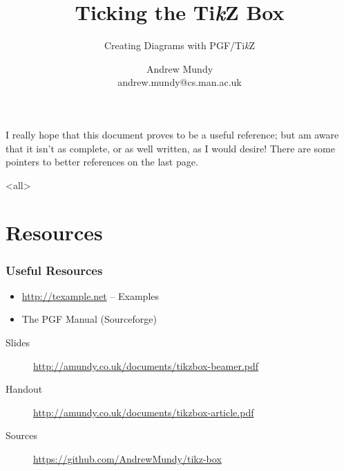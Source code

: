 \title{Ticking the Ti\emph{k}Z Box}
\subtitle{Creating Diagrams with PGF/Ti\emph{k}Z}
\author{Andrew Mundy\\andrew.mundy@cs.man.ac.uk}
\date{}

\usepackage{tikz}
\usetikzlibrary{automata,chains,scopes,patterns,petri}

\usepackage{etoolbox}

\usepackage{subcaption}

\lstset{
	frame = tb,
	columns = fullflexible,
}


	\maketitle
	\begin{frame}
		\titlepage
	\end{frame}

	I really hope that this document proves to be a useful reference; but am aware that it isn't as complete, or as well written, as I would desire!
	There are some pointers to better references on the last page.

	\mode<all>
		
		
		\appendix
		
	\mode*

	\section{Resources}
	\begin{frame}
		\frametitle{Useful Resources}
		\begin{itemize}
			\item \url{http://texample.net} -- Examples
			\item The PGF Manual (Sourceforge)
		\end{itemize}

		\begin{description}
			\item[Slides] \url{http://amundy.co.uk/documents/tikzbox-beamer.pdf}
			\item[Handout] \url{http://amundy.co.uk/documents/tikzbox-article.pdf}
			\item[Sources] \url{https://github.com/AndrewMundy/tikz-box}
		\end{description}
	\end{frame}


